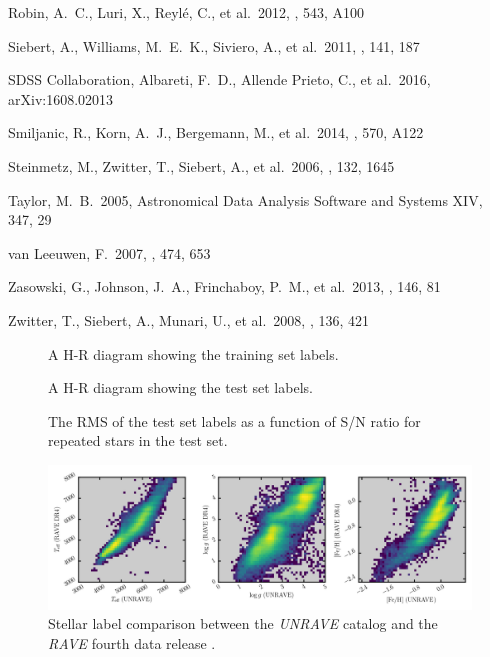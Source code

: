 \documentclass[preprint,trackchanges]{aastex}
\newcommand{\project}[1]{\textsl{#1}}
\begin{document}
\begin{thebibliography}{dummy}
 Robin, A.~C., Luri, X., Reyl{\'e}, C., et al.\ 2012, \aap, 543, A100 

 Siebert, A., Williams, M.~E.~K., Siviero, A., et al.\ 2011, \aj, 141, 187 

 SDSS Collaboration, Albareti, F.~D., Allende Prieto, C., et al.\ 2016, arXiv:1608.02013 

 Smiljanic, R., Korn, A.~J., Bergemann, M., et al.\ 2014, \aap, 570, A122 

 Steinmetz, M., Zwitter, T., Siebert, A., et al.\ 2006, \aj, 132, 1645 

 Taylor, M.~B.\ 2005, Astronomical Data Analysis Software and Systems XIV, 347, 29 

 van Leeuwen, F.\ 2007, \aap, 474, 653 

 Zasowski, G., Johnson, J.~A., Frinchaboy, P.~M., et al.\ 2013, \aj, 146, 81 

 Zwitter, T., Siebert, A., Munari, U., et al.\ 2008, \aj, 136, 421 

\end{thebibliography}

\clearpage

\begin{figure}[p]
\caption{A H-R diagram showing the training set labels.\label{fig:training-set-hrd}}
\end{figure}

\begin{figure}[p]
\caption{A H-R diagram showing the test set labels.\label{fig:test-set-hrd}}
\end{figure}

\begin{figure}[p]
\caption{The RMS of the test set labels as a function of S/N ratio for repeated stars in the test set.\label{fig:test-set-repeats}}
\end{figure}

\begin{figure}[p]
\includegraphics[width=\textwidth]{figures/dr4-comparison.png}
\caption{Stellar label comparison between the \project{UNRAVE} catalog and the \project{RAVE} fourth data release \citep{Kordopatis_2013}.\label{fig:rave-dr4-comparison}}
\end{figure}
\end{document}
